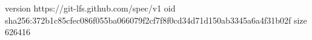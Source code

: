 version https://git-lfs.github.com/spec/v1
oid sha256:372b1c85cfec086f055ba066079f2cf7f8f0cd34d71d150ab3345a6a4f31b02f
size 626416
